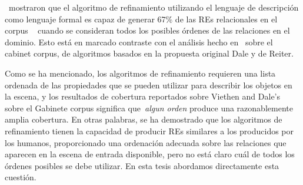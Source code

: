 \cite{arec2:2008:Areces}~mostraron que el algoritmo de refinamiento utilizando el lenguaje de descripci\'on \el como lenguaje formal es capaz de generar 67\% de
las REs relacionales en el corpus ~\cite{viethen06:_algor_for_gener_refer_expres} cuando se consideran todos los posibles \'ordenes de las relaciones en el dominio. Esto est\'a en marcado contraste con el an\'alisis hecho en~\cite{viethen06:_algor_for_gener_refer_expres} sobre el cabinet corpus, de algoritmos basados en la propuesta original Dale y de Reiter.



Como se ha mencionado, los algoritmos de refinamiento requieren una
lista ordenada de las propiedades que se pueden utilizar para describir los objetos en la escena, y los resultados de cobertura reportados sobre Viethen and 
Dale's sobre el 
Gabinete corpus significa que~\emph{algun orden} produce una razonablemente amplia cobertura. En otras palabras, se ha demostrado que los algoritmos de refinamiento tienen la capacidad de producir REs similares a los producidos por los humanos, proporcionado una ordenaci\'on adecuada sobre las relaciones que aparecen
en la escena de entrada disponible, pero no est\'a claro cu\'al de todos los \'ordenes posibles se debe utilizar. En esta tesis abordamos directamente esta cuesti\'on.


